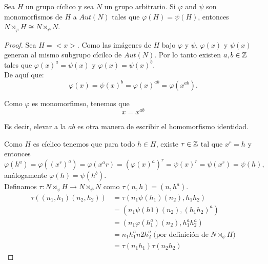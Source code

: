 Sea $H$ un grupo cíclico y sea $N$ un grupo arbitrario. Si $\varphi$ and $\psi$ son monomorfismos 
de $H$ a $Aut(N)$ tales que $\varphi(H) = \psi(H)$, entonces 
$N \rtimes_\varphi H \cong N \rtimes_\psi N$. \par\null

\begin{proof}
    Sea $H = <x>$. Como las imágenes de $H$ bajo $\varphi$ y $\psi$, $\varphi(x)$ y $\psi(x)$ generan
    al mismo subgrupo cícilco de $Aut(N)$. Por lo tanto existen $a,b \in \mathbb{Z}$ tales que 
    $\varphi(x)^a = \psi(x)$ y $\varphi(x) = \psi(x)^b$. \\ 
    
    De aquí que:
    \begin{equation} 
      \varphi(x) = \psi(x)^b = \varphi(x)^{ab} = \varphi(x^{ab}).
    \end{equation}

    Como $\varphi$ es monomorfimso, tenemos que 
    \begin{equation} \label{propocicion11:identidad}
        x = x^{ab}
    \end{equation} 
    
    Es decir, elevar a la $ab$ es otra manera de escribir el homomorfismo identidad.		
    
    Como $H$ es cíclico tenemos que para todo $h \in H$, existe $r \in \mathbb{Z}$ tal que $x^r = h$ y entonces
    $$
    \varphi(h^a) = \varphi((x^r)^a) = 
    \varphi(x^ar) = (\varphi(x)^a)^r = 
    \psi(x)^r = \psi(x^r) = \psi(h),
    $$ 
    análogamente $\varphi(h) = \psi(h^b)$.  \\
    
    Definamos $\tau : N \rtimes_\varphi H \rightarrow N \rtimes_\psi N$ como $\tau(n,h)= (n, h^a)$.\\
    
    \begin{align}
    \tau((n_1, h_1)(n_2, h_2))	&=  \tau(n_1 \psi(h_1)(n_2), h_1h_2)\\
                                &= (n_1\psi(h1)(n_2), (h_1 h_2)^a) \\
                                &= (n_1\varphi(h_1^a)(n_2), h_1^a h_2^a)\\
                                &= n_1 h_1^a n2 h_2^a  \;\text{(por definición de} \; N \rtimes_\psi H \text{)}\\
                                &= \tau(n_1 h_1) \tau(n_2 h_2)
    \end{align}
                                    

\end{proof}
